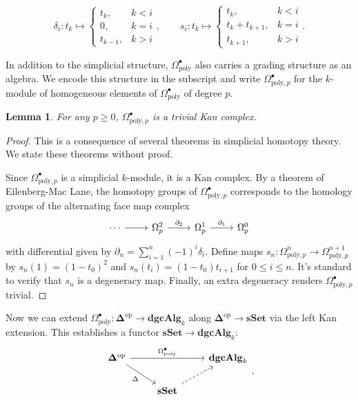 \documentclass[psamsfonts]{amsart}
\newtheorem{lem}{Lemma}[section]
\theoremstyle{definition}
\newcommand{\sSet}{\mathbf{sSet}}
\newcommand{\dgcAlg}{\mathbf{dgcAlg}}
\numberwithin{equation}{section}
\begin{document}
\[\delta_i:t_k\mapsto\begin{cases}
t_k,&k<i\\0,&k=i\\t_{k-1},&k>i
\end{cases},\quad\quad s_i:t_k\mapsto\begin{cases}
t_k,&k<i\\t_k+t_{k+1},&k=i\\t_{k+1},&k>i
\end{cases}.\]

\bigbreak In addition to the simplicial structure, $\Omega^\bullet_\textrm{poly}$ also carries a grading structure as an algebra. We encode this structure in the subscript and write $\Omega^\bullet_{\textrm{poly},p}$ for the $k$-module of homogeneous elements of $\Omega^\bullet_\textrm{poly}$ of degree $p$.

\begin{lem}
For any $p\geq0$, $\Omega^\bullet_{\mathrm{poly},p}$ is a trivial Kan complex.
\end{lem}
\begin{proof}
This is a consequence of several theorems in simplicial homotopy theory. We state these theorems without proof.\medbreak

Since $\Omega^\bullet_{\textrm{poly},p}$ is a simplicial $k$-module, it is a Kan complex. By a theorem of Eilenberg-Mac Lane, the homotopy groups of $\Omega^\bullet_{\textrm{poly},p}$ corresponds to the homology groups of the alternating face map complex
\[\begin{tikzcd}
\cdots\arrow[r]&\Omega^2_p\arrow[r,"\partial_2"]&\Omega^1_p\arrow[r,"\partial_1"]&\Omega^0_p\end{tikzcd}\]
with differential given by $\partial_n=\sum_{i=1}^n(-1)^i\delta_i$. Define maps $s_n:\Omega^n_{\textrm{poly},p}\to\Omega^{n+1}_{\textrm{poly},p}$ by $s_n(1)=(1-t_0)^2$ and $s_n(t_i)=(1-t_0)t_{i+1}$ for $0\leq i\leq n$. It's standard to verify that $s_n$ is a degeneracy map. Finally, an extra degeneracy renders $\Omega^\bullet_{\textrm{poly},p}$ trivial.
\end{proof}

Now we can extend $\Omega^\bullet_\textrm{poly}:\mathbf{\Delta}^\textrm{op}\to\dgcAlg_k$ along $\mathbf{\Delta}^\textrm{op}\to\sSet$ via the left Kan extension. This establishes a functor $\sSet\to\dgcAlg_k$:
\[\begin{tikzcd}
\mathbf{\Delta}^\textrm{op}\arrow[swap]{dr}{\Delta}\arrow{rr}{\Omega^\bullet_\textrm{poly}}&&\dgcAlg_k\\
&\sSet\arrow[swap,near start,dashed]{ur}
\end{tikzcd}.\]
\end{document}
